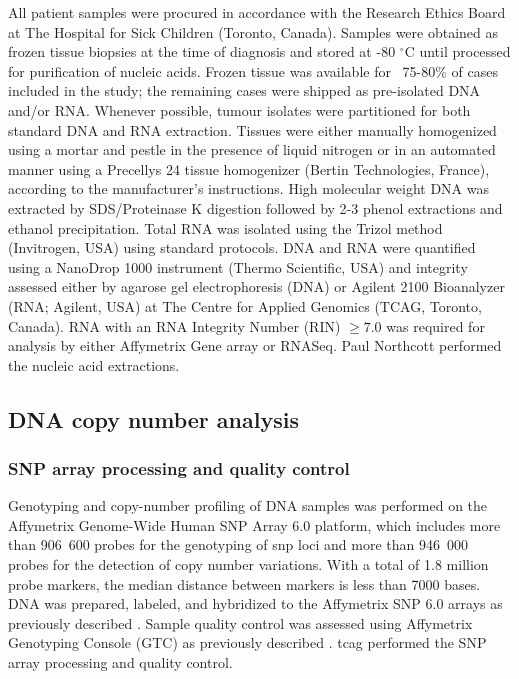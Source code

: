 All patient samples were procured in accordance with the Research Ethics Board at The Hospital for Sick Children (Toronto, Canada).  Samples were obtained as frozen tissue biopsies at the time of diagnosis and stored at -80 $^{\circ}$C until processed for purification of nucleic acids.  Frozen tissue was available for ~75-80\% of cases included in the study; the remaining cases were shipped as pre-isolated DNA and/or RNA.
Whenever possible, tumour isolates were partitioned for both standard DNA and RNA extraction.  Tissues were either manually homogenized using a mortar and pestle in the presence of liquid nitrogen or in an automated manner using a Precellys 24 tissue homogenizer (Bertin Technologies, France), according to the manufacturer’s instructions.  High molecular weight DNA was extracted by SDS/Proteinase K digestion followed by 2-3 phenol extractions and ethanol precipitation.  Total RNA was isolated using the Trizol method (Invitrogen, USA) using standard protocols.  DNA and RNA were quantified using a NanoDrop 1000 instrument (Thermo Scientific, USA) and integrity assessed either by agarose gel electrophoresis (DNA) or Agilent 2100 Bioanalyzer (RNA; Agilent, USA) at The Centre for Applied Genomics (TCAG, Toronto, Canada).  RNA with an RNA Integrity Number (RIN) $\ge 7.0$ was required for analysis by either Affymetrix Gene array or RNASeq. Paul Northcott performed the nucleic acid extractions.

\subsection{DNA copy number analysis}

\subsubsection{SNP array processing and quality control}

Genotyping and copy-number profiling of DNA samples was performed on the Affymetrix Genome-Wide Human SNP Array 6.0 platform, which includes more than 906~600 probes for the genotyping of \gls{snp} loci and more than 946~000 probes for the detection of copy number variations. With a total of 1.8 million probe markers, the median distance between markers is less than 7000 bases. DNA was prepared, labeled, and hybridized to the Affymetrix SNP 6.0 arrays as previously described . Sample quality control was assessed using Affymetrix Genotyping Console (GTC) as previously described . \gls{tcag} performed the SNP array processing and quality control.

